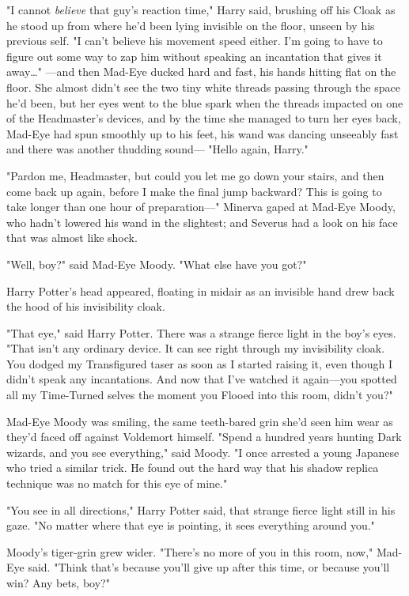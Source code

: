 "I cannot \emph{believe} that guy's reaction time," Harry said, brushing off his Cloak as he stood up from where he'd been lying invisible on the floor, unseen by his previous self. "I can't believe his movement speed either. I'm going to have to figure out some way to zap him without speaking an incantation that gives it away{\ldots}"
\sbreak
---and then Mad-Eye ducked hard and fast, his hands hitting flat on the floor. She almost didn't see the two tiny white threads passing through the space he'd been, but her eyes went to the blue spark when the threads impacted on one of the Headmaster's devices, and by the time she managed to turn her eyes back, Mad-Eye had spun smoothly up to his feet, his wand was dancing unseeably fast and there was another thudding sound---
\sbreak
"Hello again, Harry."

"Pardon me, Headmaster, but could you let me go down your stairs, and then come back up again, before I make the final jump backward? This is going to take longer than one hour of preparation---"
\sbreak
Minerva gaped at Mad-Eye Moody, who hadn't lowered his wand in the slightest; and Severus had a look on his face that was almost like shock.

"Well, boy?" said Mad-Eye Moody. "What else have you got?"

Harry Potter's head appeared, floating in midair as an invisible hand drew back the hood of his invisibility cloak.

"That eye," said Harry Potter. There was a strange fierce light in the boy's eyes. "That isn't any ordinary device. It can see right through my invisibility cloak. You dodged my Transfigured taser as soon as I started raising it, even though I didn't speak any incantations. And now that I've watched it again---you spotted all my Time-Turned selves the moment you Flooed into this room, didn't you?"

Mad-Eye Moody was smiling, the same teeth-bared grin she'd seen him wear as they'd faced off against Voldemort himself. "Spend a hundred years hunting Dark wizards, and you see everything," said Moody. "I once arrested a young Japanese who tried a similar trick. He found out the hard way that his shadow replica technique was no match for this eye of mine."

"You see in all directions," Harry Potter said, that strange fierce light still in his gaze. "No matter where that eye is pointing, it sees everything around you."

Moody's tiger-grin grew wider. "There's no more of you in this room, now," Mad-Eye said. "Think that's because you'll give up after this time, or because you'll win? Any bets, boy?"

